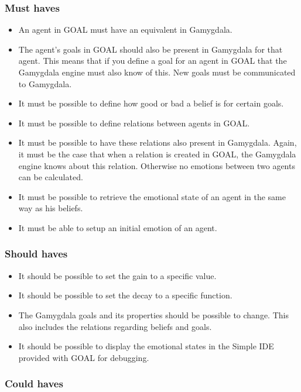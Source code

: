 \documentclass[]{article}
\begin{document}
\subsubsection*{Must haves}
\begin{itemize}
	\item An \gls{agent} in GOAL must have an equivalent in Gamygdala.
	\item The agent's goals in GOAL should also be present in Gamygdala for that agent. This means that if you define a goal for an agent in GOAL that the Gamygdala engine must also know of this. New goals must be communicated to Gamygdala.
	\item It must be possible to define how good or bad a belief is for certain goals.
	\item It must be possible to define relations between agents in GOAL.
	\item It must be possible to have these relations also present in Gamygdala. Again, it must be the case that when a relation is created in GOAL, the Gamygdala engine knows about this relation. Otherwise no emotions between two agents can be calculated.
	\item It must be possible to retrieve the emotional state of an agent in the same way as his beliefs.
	\item It must be able to setup an initial emotion of an agent.
\end{itemize}
 
\subsubsection*{Should haves}

\begin{itemize}
	\item It should be possible to set the gain to a specific value.
	\item It should be possible to set the decay to a specific function.
	\item The  Gamygdala goals and its properties should be possible to change. This also includes the relations regarding beliefs and goals.
	\item It should be possible to display the emotional states in the Simple IDE\cite{SimpleIDE} provided with GOAL for debugging.
\end{itemize}


\subsubsection*{Could haves}
\end{document}
